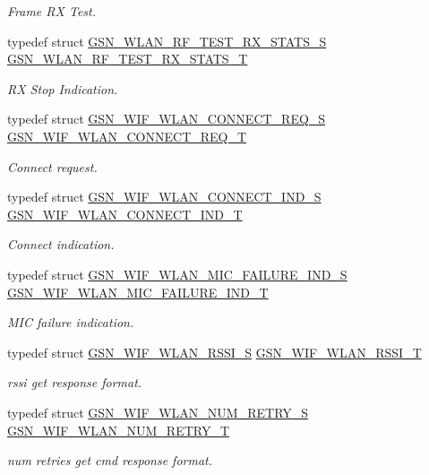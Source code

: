 \begin{DoxyCompactItemize}
\begin{DoxyCompactList}\small\item\em Frame RX Test. \end{DoxyCompactList}\item 
typedef struct \hyperlink{a00419}{GSN\_\-WLAN\_\-RF\_\-TEST\_\-RX\_\-STATS\_\-S} \hyperlink{a00677_ga150fdf6ec3c7c370b27651412b36653a}{GSN\_\-WLAN\_\-RF\_\-TEST\_\-RX\_\-STATS\_\-T}
\begin{DoxyCompactList}\small\item\em RX Stop Indication. \end{DoxyCompactList}\item 
typedef struct \hyperlink{a00374}{GSN\_\-WIF\_\-WLAN\_\-CONNECT\_\-REQ\_\-S} \hyperlink{a00677_ga017431808d3e402931e4b6bfd133240b}{GSN\_\-WIF\_\-WLAN\_\-CONNECT\_\-REQ\_\-T}
\begin{DoxyCompactList}\small\item\em Connect request. \end{DoxyCompactList}\item 
typedef struct \hyperlink{a00373}{GSN\_\-WIF\_\-WLAN\_\-CONNECT\_\-IND\_\-S} \hyperlink{a00677_gafb178a89c3d7936c482fd6c6cb2e17af}{GSN\_\-WIF\_\-WLAN\_\-CONNECT\_\-IND\_\-T}
\begin{DoxyCompactList}\small\item\em Connect indication. \end{DoxyCompactList}\item 
typedef struct \hyperlink{a00391}{GSN\_\-WIF\_\-WLAN\_\-MIC\_\-FAILURE\_\-IND\_\-S} \hyperlink{a00677_ga7692f300e14cded7c79c50838226ed2b}{GSN\_\-WIF\_\-WLAN\_\-MIC\_\-FAILURE\_\-IND\_\-T}
\begin{DoxyCompactList}\small\item\em MIC failure indication. \end{DoxyCompactList}\item 
typedef struct \hyperlink{a00395}{GSN\_\-WIF\_\-WLAN\_\-RSSI\_\-S} \hyperlink{a00677_ga6bf98e2985565ecb3084ad0fb0d0e8c8}{GSN\_\-WIF\_\-WLAN\_\-RSSI\_\-T}
\begin{DoxyCompactList}\small\item\em rssi get response format. \end{DoxyCompactList}\item 
typedef struct \hyperlink{a00392}{GSN\_\-WIF\_\-WLAN\_\-NUM\_\-RETRY\_\-S} \hyperlink{a00677_ga941d2bc71947bd100c963211cf48a341}{GSN\_\-WIF\_\-WLAN\_\-NUM\_\-RETRY\_\-T}
\begin{DoxyCompactList}\small\item\em num retries get cmd response format. \end{DoxyCompactList}\item 

\end{DoxyCompactItemize}
